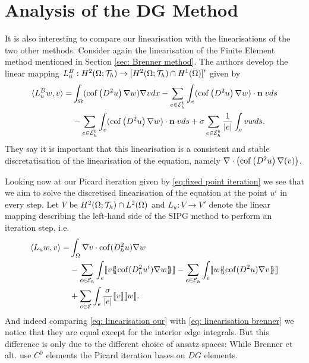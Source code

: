 \section{Analysis of the DG Method}
It is also interesting to compare our linearisation with the linearisations of the two other methods.
Consider again the linearisation of the Finite Element method mentioned in Section \ref{sec: Brenner method}. The authors develop the linear mapping $L^B_u:H^2(\Omega; \mathcal{T}_h) \rightarrow [H^2(\Omega; \mathcal{T}_h) \cap H^1(\Omega)]'$ given by
\begin{align}
 \langle L^B_{u} w, v \rangle
	=&\int_\Omega (\operatorname{cof} \left( D^2  u \right)\nabla w) \nabla v dx
		- \sum_{e \in \mathcal{E}_h^b} \int_{e} (\operatorname{cof} \left( D^2 u \right)\nabla w) \cdot \mathbf n \; v ds \nonumber \\
		&-  \sum_{e \in \mathcal{E}_h^b} \int_{e} (\operatorname{cof} \left( D^2 u \right)\nabla w) \cdot \mathbf n \; v ds
		+ \sigma \sum_{e \in \mathcal{E}_h^b} \frac 1 {|e|} \int_e v w ds.
		\label{eq: linearisation brenner}
\end{align}
They say it is important that this linearisation is a consistent and stable discretatisation of the linearisation of the \MA equation, namely $\nabla \cdot \left( \operatorname{cof} \left( D^2 u  \right) \nabla (v) \right)$.

Looking now at our Picard iteration given by \ref{eq:fixed point iteration} we see that we aim to solve the discretised linearisation of the \MA equation at the point $u^i$ in every step.
Let $V$ be $H^2(\Omega; \mathcal{T}_h) \cap L^2(\Omega)$ and $L_u: V \rightarrow V'$ denote the linear mapping describing the left-hand side of the SIPG method to perform an iteration step, i.e.
\begin{align}
	\bilin {L_u w} v =
 &\int_{\Omega} \nabla v \cdot \cof(D_h^2 u) \nabla w  \nonumber\\
 & -\sum\limits_{e \in \edges}\int_{e} \jump {v \average { \cof(D_h^2 u^{i}) \nabla w} }
 - \sum\limits_{e \in \edges}\int_{e} \jump {w \average{ \cof(D^2 u) \nabla v} } \nonumber\\  
 & +\sum\limits_{e \in \bigEps} \int_e \frac \sigma {|e|} \jump {v}  \jump {w}. \label{eq: linearisation our}
\end{align}
And indeed comparing \eqref{eq: linearisation our} with \eqref{eq: linearisation brenner} we notice that they are equal except for the interior edge integrals. But this difference is only due to the different choice of ansatz spaces: While Brenner et alt. use $C^0$ elements the Picard iteration bases on $DG$ elements.

